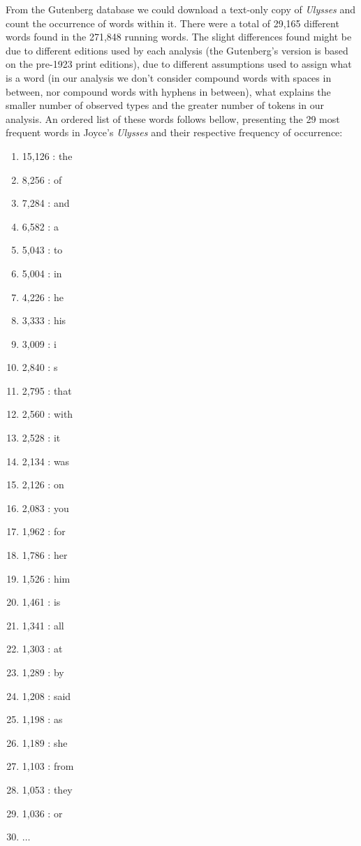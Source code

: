From the Gutenberg database we could download a text-only copy of \textit{Ulysses}
and count the occurrence of words within it. 
There were a total of 29,165 different words found in the 271,848 running words.
The slight differences found might be due to different editions used by each analysis
(the Gutenberg's version is based on the pre-1923 print editions), due to different assumptions
used to assign what is a word (in our analysis we don't consider compound words with 
spaces in between, nor compound words with hyphens in between), what explains the
smaller number of observed types and the greater number of tokens in our analysis.
An ordered list of these words follows bellow, presenting the 29 most frequent words in 
Joyce's \textit{Ulysses} and their respective frequency of occurrence:

\begin{footnotesize}
\begin{multicols}{3}
\begin{enumerate}
    \item 15,126 : the
    \item 8,256 : of
    \item 7,284 : and
    \item 6,582 : a
    \item 5,043 : to
    \item 5,004 : in
    \item 4,226 : he
    \item 3,333 : his
    \item 3,009 : i
    \item 2,840 : s
    \item 2,795 : that
    \item 2,560 : with
    \item 2,528 : it
    \item 2,134 : was
    \item 2,126 : on
    \item 2,083 : you
    \item 1,962 : for
    \item 1,786 : her
    \item 1,526 : him
    \item 1,461 : is
    \item 1,341 : all
    \item 1,303 : at
    \item 1,289 : by
    \item 1,208 : said
    \item 1,198 : as
    \item 1,189 : she
    \item 1,103 : from
    \item 1,053 : they
    \item 1,036 : or
    \item[] $\ldots$
\end{enumerate}
\end{multicols}
\end{footnotesize}

